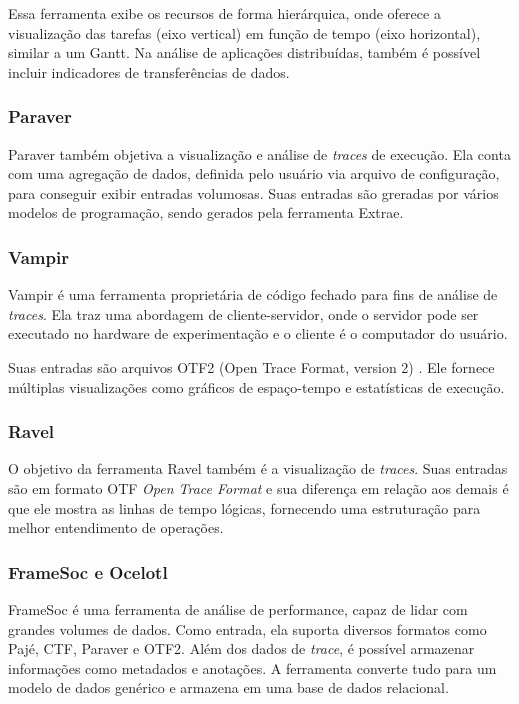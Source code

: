 \documentclass[prop-esp]{iiufrgs}
\begin{document}
Essa ferramenta exibe os recursos de forma hierárquica, onde oferece a visualização das tarefas (eixo vertical) em função de tempo (eixo horizontal), similar a um Gantt. Na análise de aplicações distribuídas, também é possível incluir indicadores de transferências de dados.

\subsubsection*{Paraver}
Paraver \cite{ref:paraver} também objetiva a visualização e análise de \emph{traces} de execução. Ela conta com uma agregação de dados, definida pelo
usuário via arquivo de configuração, para conseguir exibir entradas volumosas. Suas entradas são greradas por vários modelos de programação, sendo gerados pela ferramenta Extrae.

\subsubsection*{Vampir}
Vampir \cite{ref:vampir} é uma ferramenta proprietária de código fechado para fins de análise de \emph{traces}. Ela traz uma abordagem de cliente-servidor, onde o servidor pode ser executado no hardware de experimentação e o cliente é o computador do usuário.

Suas entradas são arquivos OTF2 (Open Trace Format, version 2) \cite{ref:otf2}. Ele fornece múltiplas visualizações como gráficos de espaço-tempo e estatísticas de execução.

\subsubsection*{Ravel}
O objetivo da ferramenta Ravel \cite{ref:ravel} também é a visualização de \emph{traces}. Suas entradas são em formato OTF \emph{Open Trace Format} e sua diferença em relação aos demais é que ele mostra as linhas de tempo lógicas, fornecendo uma estruturação para melhor entendimento de operações.

\subsubsection*{FrameSoc e Ocelotl}

FrameSoc \cite{ref:framesoc} é uma ferramenta de análise de performance, capaz de lidar com grandes volumes de dados. Como entrada, ela suporta diversos
formatos como Pajé, CTF, Paraver e OTF2. Além dos dados de \emph{trace}, é possível armazenar informações como metadados e anotações. A ferramenta converte tudo para um modelo de dados genérico e armazena em uma base de dados relacional.
\end{document}
